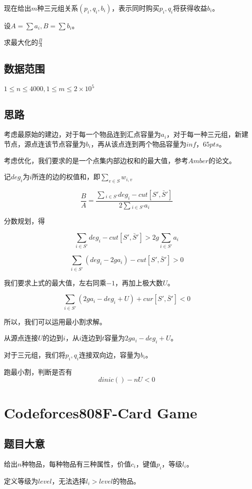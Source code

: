 \documentclass{ctexart}
\numberwithin{equation}{section}
\begin{document}
\begin{flushleft}
  现在给出$m$种三元组关系$(p_i,q_i,b_i)$，表示同时购买$p_i,q_i$将获得收益$b_i$。

  设$A=\sum a_i,B=\sum b_i$。

  求最大化的$\frac{B}{A}$
  
  \subsection{数据范围}
  $1\le n \le 4000,1\le m \le 2\times 10^5$
  \subsection{思路}
  考虑最原始的建边，对于每一个物品连到汇点容量为$a_i$，对于每一种三元组，新建节点，源点连该节点容量为$b_i$，再从该点连到两个物品容量为$inf$，$65pts$。

  考虑优化，我们要求的是一个点集内部边权和的最大值，参考$Amber$的论文。

  记$deg_i$为$i$所连的边的权值和，即$\sum_{v\in S}w_{i,v}$

  $$\frac{B}{A} = \displaystyle\frac{\sum\displaystyle_{i\in S'}deg_i-cut[S',\bar S']}{2\sum\displaystyle_{i\in S'}a_i}$$

  分数规划，得

  $$\sum_{i\in S'}deg_i-cut[S',\bar S']> 2g\sum_{i\in S'}a_i$$

  $$\sum_{i\in S'}(deg_i-2ga_i)-cut[S',\bar S'] > 0$$

  我们要求上式的最大值，左右同乘$-1$，再加上极大数$U$。

  $$\sum_{i\in S'}(2ga_i-deg_i+U)+cur[S',\bar S'] < 0$$

  所以，我们可以运用最小割求解。

  从源点连接$U$的边到$i$，从$i$连边到$t$容量为$2ga_i-deg_i+U$。

  对于三元组，我们将$p_i,q_i$连接双向边，容量为$b_i$。

  跑最小割，判断是否有$$dinic()-nU<0$$

  \newpage

  \section{Codeforces808F-Card Game}
  \subsection{题目大意}
  给出$n$种物品，每种物品有三种属性，价值$c_i$，键值$p_i$，等级$l_i$。

  定义等级为$level$，无法选择$l_i>level$的物品。


\end{flushleft}
\end{document}
